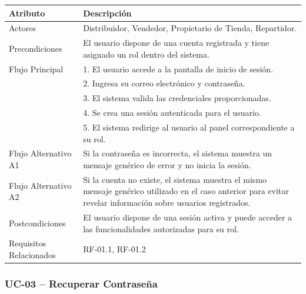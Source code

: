 \documentclass[12pt,a4paper]{report}
\begin{document}
\begin{longtable}{|p{4cm}|p{10cm}|}
\hline
\textbf{Atributo} & \textbf{Descripción} \\ \hline
Actores & Distribuidor, Vendedor, Propietario de Tienda, Repartidor. \\ \hline
Precondiciones & El usuario dispone de una cuenta registrada y tiene asignado un rol dentro del sistema. \\ \hline
Flujo Principal &
1. El usuario accede a la pantalla de inicio de sesión.\\
& 2. Ingresa su correo electrónico y contraseña.\\
& 3. El sistema valida las credenciales proporcionadas.\\
& 4. Se crea una sesión autenticada para el usuario.\\
& 5. El sistema redirige al usuario al panel correspondiente a su rol. \\ \hline
Flujo Alternativo A1 & Si la contraseña es incorrecta, el sistema muestra un mensaje genérico de error y no inicia la sesión. \\ \hline
Flujo Alternativo A2 & Si la cuenta no existe, el sistema muestra el mismo mensaje genérico utilizado en el caso anterior para evitar revelar información sobre usuarios registrados. \\ \hline
Postcondiciones & El usuario dispone de una sesión activa y puede acceder a las funcionalidades autorizadas para su rol. \\ \hline
Requisitos Relacionados & RF-01.1, RF-01.2 \\ \hline
\end{longtable}
\subsubsection{UC-03 -- Recuperar Contraseña}
\end{document}
